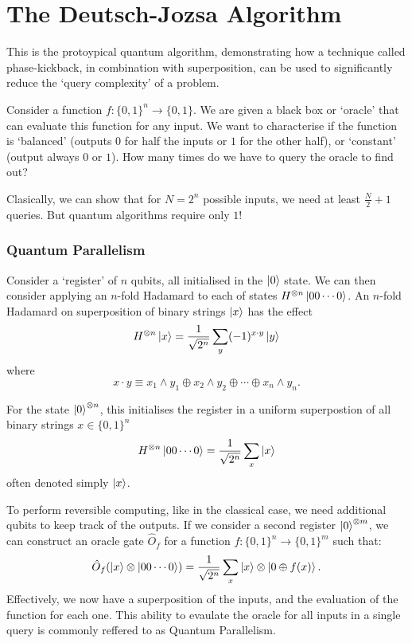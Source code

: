 \documentclass[11pt]{article}
\begin{document}
\section{The Deutsch-Jozsa Algorithm}
This is the protoypical quantum algorithm, demonstrating how a technique called phase-kickback, in combination with superposition, can be used to significantly reduce the `query complexity' of a problem.

Consider a function $f : \{0,1\}^{n} \rightarrow \{0,1\}$. We are given a black box or `oracle' that can evaluate this function for any input. We want to characterise if the function is `balanced' (outputs $0$ for half the inputs or $1$ for the other half), or `constant' (output always $0$ or $1$). How many times do we have to query the oracle to find out?

Clasically, we can show that for $N=2^{n}$ possible inputs, we need at least $\frac{N}{2} + 1$ queries. But quantum algorithms require only $1$!

\subsubsection*{Quantum Parallelism}
Consider a `register' of $n$ qubits, all initialised in the $\ket{0}$ state. We can then consider applying an $n$-fold Hadamard to each of states $H^{\otimes n}\ket{00\cdots0}$. An $n$-fold Hadamard on superposition of binary strings $\ket{x}$ has the effect
\begin{equation}
    H^{\otimes n}\ket{x} = \frac{1}{\sqrt{2^{n}}}\sum_{y}(-1)^{x\cdot y}\ket{y}
\end{equation}
where
\[x\cdot y \equiv x_{1}\wedge y_{1}\oplus x_{2}\wedge y_{2}\oplus \cdots \oplus x_{n}\wedge y_{n} .\]

For the state $\ket{0}^{\otimes n}$, this initialises the register in a uniform superpostion of all binary strings $x\in\{ 0,1\}^{n}$
\[H^{\otimes n}\ket{00\cdots0} = \frac{1}{\sqrt{2^{n}}}\sum_{x}\ket{x}\]
often denoted simply $\ket{x}$.

To perform reversible computing, like in the classical case, we need additional qubits to keep track of the outputs. If we consider a second register $\ket{0}^{\otimes m}$, we can construct an oracle gate $\hat{O}_{f}$ for a function $f:\{0,1\}^{n}\rightarrow\{0,1\}^{m}$ such that:
\begin{equation}
    \hat{O}_{f}(\ket{x}\otimes\ket{00\cdots 0}) = \frac{1}{\sqrt{2^{n}}} \sum_{x}\ket{x}\otimes\ket{0\oplus f(x)}.
\end{equation}
Effectively, we now have a superposition of the inputs, and the evaluation of the function for each one. This ability to evaulate the oracle for all inputs in a single query is commonly reffered to as Quantum Parallelism.
\end{document}
